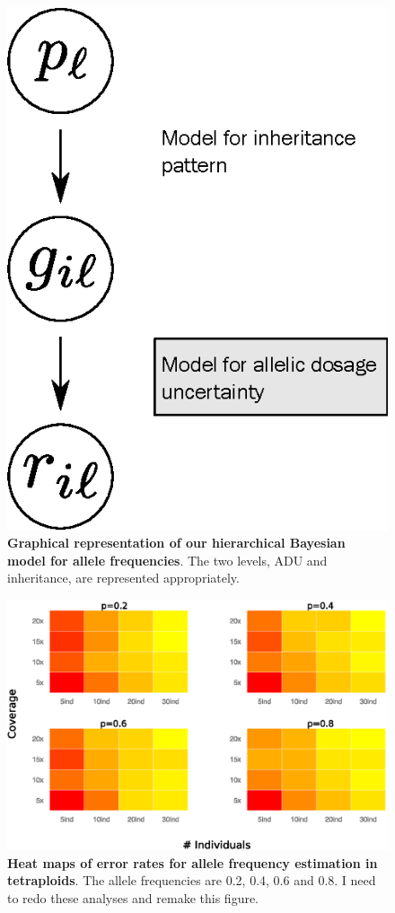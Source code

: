 \documentclass[11pt,english,letterpaper,oneside]{article}
\begin{document}

\begin{figure}[b]
\centering
\caption{\textbf{Graphical representation of our hierarchical Bayesian model for allele frequencies}. The two levels, ADU and inheritance, are represented appropriately.}
\vspace{0.25in}
\includegraphics{fig/model-graph}
\end{figure}
\vfill

\begin{figure}[b]
\centering
\caption{\textbf{Heat maps of error rates for allele frequency estimation in tetraploids}. The allele frequencies are 0.2, 0.4, 0.6 and 0.8. I need to redo these analyses and remake this figure.}
\vspace{0.25in}
\includegraphics{fig/tetraploid-heatmaps}
\end{figure}
\end{document}
